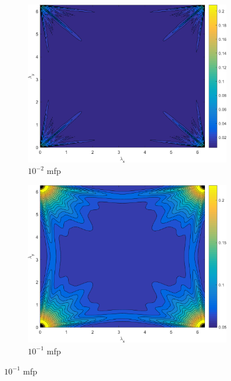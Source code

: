 \begin{figure}
\centering
	{
	\begin{subfigure}[b]{0.485\textwidth}
		\centering
		\includegraphics[width=0.975\textwidth]{figures/sec_DSA/SI_MIP_C=4_UPWLD1_LS16_x=1e-2_dydx=1_contour.png}
		\caption{$10^{-2}$ mfp}
	\end{subfigure}
	\hfill
	\begin{subfigure}[b]{0.485\textwidth}
		\centering
		\includegraphics[width=0.975\textwidth]{figures/sec_DSA/SI_MIP_C=4_UPWLD1_LS16_x=1e-1_dydx=1_contour.png}
		\caption{$10^{-1}$ mfp}
	\end{subfigure}
	}
	\vspace{0.5cm}

\end{figure}
